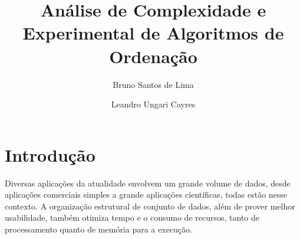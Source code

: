 \documentclass[conference]{IEEEtran}
\begin{document}
\renewcommand{\abstractname}{Resumo}
\renewcommand{\refname}{REFERÊNCIAS}
\renewcommand{\tablename}{TABELA}


\title{Análise de Complexidade e Experimental de Algoritmos de Ordenação}



\author{ 
 Bruno Santos de Lima\\ 
 \and 
 Leandro Ungari Cayres\\ 
} 



\maketitle

 




\IEEEpeerreviewmaketitle


\section{Introdução}

Diversas aplicações da atualidade envolvem um grande volume de dados, desde aplicações comerciais simples a grande aplicações científicas, todas estão nesse contexto. A organização estrutural de conjunto de dados, além de prover melhor usabilidade, também otimiza tempo e o consumo de recursos, tanto de processamento quanto de memória para a execução.
\end{document}
